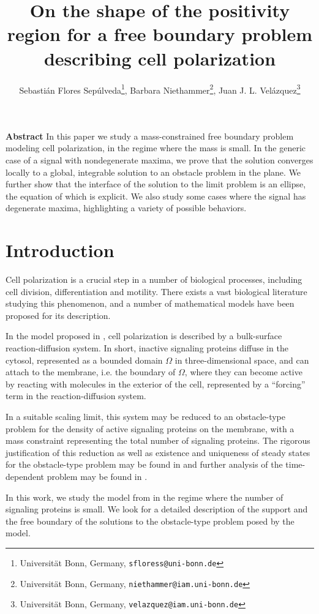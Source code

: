 \documentclass[10pt,a4paper]{article}
\title{On the shape of the positivity region for a free boundary problem describing cell polarization}
\author{Sebastián Flores Sepúlveda\thanks{Universität Bonn, Germany, \texttt{sfloress@uni-bonn.de}}, Barbara Niethammer\thanks{Universität Bonn, Germany, \texttt{niethammer@iam.uni-bonn.de}}, Juan J. L. Velázquez\thanks{Universität Bonn, Germany, \texttt{velazquez@iam.uni-bonn.de}}}
\numberwithin{equation}{section}
\begin{document}
\maketitle

{\small \textbf{Abstract}
	In this paper we study a mass-constrained free boundary problem modeling cell polarization, in the regime where the mass is small. In the generic case of a signal with nondegenerate maxima, we prove that the solution converges locally to a global, integrable solution to an obstacle problem in the plane. We further show that the interface of the solution to the limit problem is an ellipse, the equation of which is explicit. We also study some cases where the signal has degenerate maxima, highlighting a variety of possible behaviors.
}

\section{Introduction}

Cell polarization is a crucial step in a number of biological processes, including cell division, differentiation and motility. There exists a vast biological literature studying this phenomenon, and a number of mathematical models have been proposed for its description. 

In the model proposed in \cite{NRV20}, cell polarization is described by a bulk-surface reaction-diffusion system. In short, inactive signaling proteins diffuse in the cytosol, represented as a bounded domain $ \Omega $ in three-dimensional space, and can attach to the membrane, i.e. the boundary of $ \Omega $, where they can become active by reacting with molecules in the exterior of the cell, represented by a ``forcing'' term in the reaction-diffusion system. 

In a suitable scaling limit, this system may be reduced to an obstacle-type problem for the density of active signaling proteins on the membrane, with a mass constraint representing the total number of signaling proteins. The rigorous justification of this reduction as well as existence and uniqueness of steady states for the obstacle-type problem may be found in \cite{NRV20} and further analysis of the time-dependent problem may be found in \cite{LNRV21, LNRV23, LNRV25}.

In this work, we study the model from \cite{NRV20} in the regime where the number of signaling proteins is small. We look for a detailed description of the support and the free boundary of the solutions to the obstacle-type problem posed by the model.  
\end{document}
